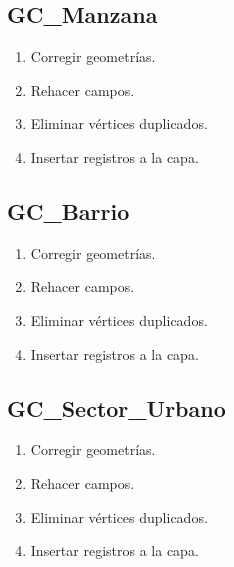 \documentclass[letterpaper,10pt,spanish]{sphinxmanual}
\begin{document}
\subsection{GC\_Manzana}
\label{\detokenize{ETL_Cobol/Model:gc-manzana}}\begin{enumerate}
%
\item {} 
Corregir geometrías.

\item {} 
Rehacer campos.

\item {} 
Eliminar vértices duplicados.

\item {} 
Insertar registros a la capa.


\end{enumerate}


\subsection{GC\_Barrio}
\label{\detokenize{ETL_Cobol/Model:gc-barrio}}\begin{enumerate}
%
\item {} 
Corregir geometrías.

\item {} 
Rehacer campos.

\item {} 
Eliminar vértices duplicados.

\item {} 
Insertar registros a la capa.


\end{enumerate}


\subsection{GC\_Sector\_Urbano}
\label{\detokenize{ETL_Cobol/Model:gc-sector-urbano}}\begin{enumerate}
%
\item {} 
Corregir geometrías.

\item {} 
Rehacer campos.

\item {} 
Eliminar vértices duplicados.

\item {} 
Insertar registros a la capa.


\end{enumerate}
\end{document}
